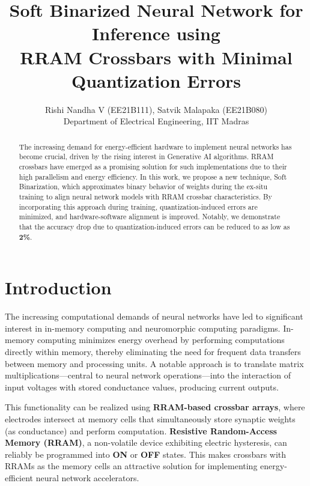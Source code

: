 \documentclass[conference]{IEEEtran}  %
\title{\LARGE \bf
Soft Binarized Neural Network for Inference using \\ RRAM Crossbars with Minimal Quantization Errors
}
\author{Rishi Nandha V (EE21B111), Satvik Malapaka (EE21B080)\\
Department of Electrical Engineering, IIT Madras\\
%
}
\begin{document}
\maketitle
\thispagestyle{empty}
\pagestyle{empty}


\begin{abstract}

The increasing demand for energy-efficient hardware to implement neural networks has become crucial, driven by the rising interest in Generative AI algorithms. RRAM crossbars have emerged as a promising solution for such implementations due to their high parallelism and energy efficiency. In this work, we propose a new technique, Soft Binarization, which approximates binary behavior of weights during the ex-situ training to align neural network models with RRAM crossbar characteristics.  By incorporating this approach during training, quantization-induced errors are minimized, and hardware-software alignment is improved. Notably, we demonstrate that the accuracy drop due to quantization-induced errors can be reduced to as low as \textbf{2\%}.

\end{abstract}


\section{Introduction}
The increasing computational demands of neural networks have led to significant interest in in-memory computing and neuromorphic computing paradigms. In-memory computing minimizes energy overhead by performing computations directly within memory, thereby eliminating the need for frequent data transfers between memory and processing units. A notable approach is to translate matrix multiplications—central to neural network operations—into the interaction of input voltages with stored conductance values, producing current outputs.

This functionality can be realized using \textbf{RRAM-based crossbar arrays}, where electrodes intersect at memory cells that simultaneously store synaptic weights (as conductance) and perform computation. \textbf{Resistive Random-Access Memory (RRAM)}, a non-volatile device exhibiting electric hysteresis, can reliably be programmed into \textbf{ON} or \textbf{OFF} states. This makes crossbars with RRAMs as the memory cells an attractive solution for implementing energy-efficient neural network accelerators.
\end{document}
